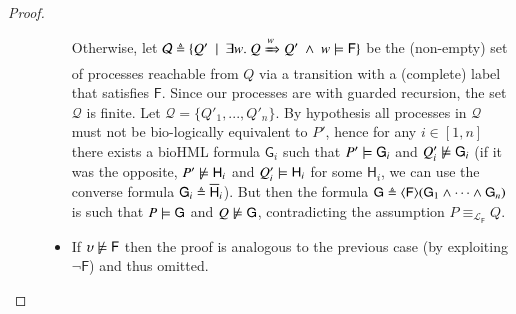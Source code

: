 \begin{proof}
\begin{description}
\begin{itemize}
Otherwise, let $\mathcal{Q}\defeq \{Q'~\mid~\exists w.\ Q\xRightarrow{w}Q' \ \wedge\ w\entails \mathsf{F}\}$ be the (non-empty) set of processes reachable from $Q$ via a transition with a (complete) label that satisfies $\mathsf{F}$. Since our processes are with guarded recursion, the set $\mathcal{Q}$ is finite. Let $\mathcal{Q} = \{Q'_1,...,Q'_n\}$. By hypothesis all processes in $\mathcal{Q}$ must not be bio-logically equivalent to $P'$, hence for any $i\in[1,n]$ there exists a bioHML formula $\mathsf{G}_i$ such that $P'\models \mathsf{G}_i$ and $Q'_i\not\models \mathsf{G}_i$ (if it was the opposite, $P'\not\models \mathsf{H}_i$ and $Q'_i\models \mathsf{H}_i$ for some $\mathsf{H}_i$, we can use the converse formula $\mathsf{G}_i\triangleq \overline{\mathsf{H}}_i$). But then the formula $\mathsf{G}\triangleq \langle \mathsf{F}\rangle(\mathsf{G}_1\wedge\dots\wedge \mathsf{G}_n)$ is such that $P\models \mathsf{G}$ and $Q\not\models \mathsf{G}$, contradicting the assumption $P\equiv_{\mathcal{L}_{\mathsf{F}}} Q$.

\item
If $\upsilon \not\models \mathsf{F}$ then the proof is analogous to the previous case (by exploiting $\neg \mathsf{F}$) and thus omitted.
\end{itemize}
\end{description}
\end{proof}

 
 